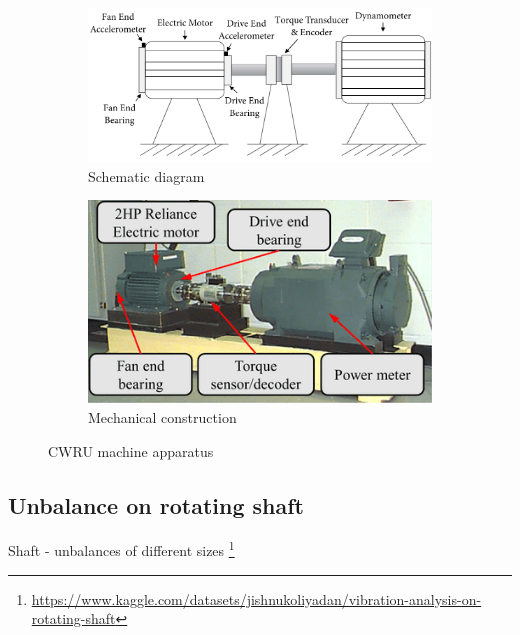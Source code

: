 \cite{jamil_feature-based_2021}

\begin{figure}[h]
\centering
\begin{subfigure}[b]{0.48\textwidth}
	\includegraphics[width=\textwidth]{assets/cwru-test-stand-2.png}
	\caption{Schematic diagram \cite{song_bearing_2022}}
\end{subfigure}
\hfill
\begin{subfigure}[b]{0.48\textwidth}
	\includegraphics[width=\textwidth]{assets/cwru-test-stand.png}
	\caption{Mechanical construction \cite{yuhong_new_2021}}
\end{subfigure}
\caption{CWRU machine apparatus}
\label{fig:cwru-simulator}
\end{figure}



\subsection{Unbalance on rotating shaft}
Shaft -  unbalances of different sizes \footnote{\url{https://www.kaggle.com/datasets/jishnukoliyadan/vibration-analysis-on-rotating-shaft}}

